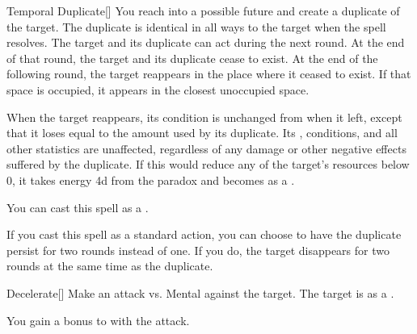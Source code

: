 \lowercase{\hypertarget{spell:Temporal Duplicate}{}}\label{spell:Temporal Duplicate}
\begin{freeability}[Rank 5]{\hypertarget{spell:Temporal Duplicate}{Temporal Duplicate}}[]
You reach into a possible future and create a duplicate of the target.
The duplicate is identical in all ways to the target when the spell resolves.
The target and its duplicate can act during the next round.
At the end of that round, the target and its duplicate cease to exist.
At the end of the following round, the target reappears in the place where it ceased to exist.
If that space is occupied, it appears in the closest unoccupied space.

When the target reappears, its condition is unchanged from when it left, except that it loses  equal to the amount used by its duplicate.
Its , conditions, and all other statistics are unaffected, regardless of any damage or other negative effects suffered by the duplicate.
If this would reduce any of the target's resources below 0, it takes energy  \plus4d from the paradox and becomes  as a .

You can cast this spell as a .

\rankline
{} If you cast this spell as a standard action, you can choose to have the duplicate persist for two rounds instead of one.
If you do, the target disappears for two rounds at the same time as the duplicate.

\end{freeability}
\vspace{0.25em}



\lowercase{\hypertarget{spell:Decelerate}{}}\label{spell:Decelerate}
\begin{freeability}[Rank 6]{\hypertarget{spell:Decelerate}{Decelerate}}[]
Make an attack vs. Mental against the target.
\hit The target is  as a .

\rankline
{} You gain a  bonus to  with the attack.

\end{freeability}
\vspace{0.25em}



